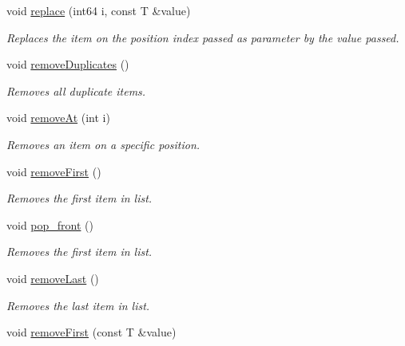 \begin{DoxyCompactItemize}
void \mbox{\hyperlink{class_a_list_a89447e683414a53f0dd0ac081c3c3f12}{replace}} (int64 i, const T \&value)
\begin{DoxyCompactList}\small\item\em Replaces the item on the position index passed as parameter by the value passed. \end{DoxyCompactList}\item 
\mbox{\label{class_a_list_a33f188595f0da046cced105c2e441506}} 
void \mbox{\hyperlink{class_a_list_a33f188595f0da046cced105c2e441506}{remove\+Duplicates}} ()
\begin{DoxyCompactList}\small\item\em Removes all duplicate items. \end{DoxyCompactList}\item 
void \mbox{\hyperlink{class_a_list_a1b29a3946800bcb13e94668b952ae6c2}{remove\+At}} (int i)
\begin{DoxyCompactList}\small\item\em Removes an item on a specific position. \end{DoxyCompactList}\item 
\mbox{\label{class_a_list_ada980037299e3dcbf05b50977216f32d}} 
void \mbox{\hyperlink{class_a_list_ada980037299e3dcbf05b50977216f32d}{remove\+First}} ()
\begin{DoxyCompactList}\small\item\em Removes the first item in list. \end{DoxyCompactList}\item 
void \mbox{\hyperlink{class_a_list_a2240edc5f38fa7e57a868bb30b747c51}{pop\+\_\+front}} ()
\begin{DoxyCompactList}\small\item\em Removes the first item in list. \end{DoxyCompactList}\item 
\mbox{\label{class_a_list_aff8e5c3e3f879ea5c8d6d9e29b321fc9}} 
void \mbox{\hyperlink{class_a_list_aff8e5c3e3f879ea5c8d6d9e29b321fc9}{remove\+Last}} ()
\begin{DoxyCompactList}\small\item\em Removes the last item in list. \end{DoxyCompactList}\item 
void \mbox{\hyperlink{class_a_list_aa4ac4af0fb772a55168ddcba13c508c3}{remove\+First}} (const T \&value)

\end{DoxyCompactItemize}
